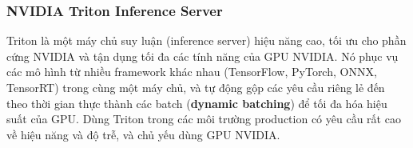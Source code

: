 \subsubsection{NVIDIA Triton Inference Server}
Triton là một máy chủ suy luận (inference server) hiệu năng cao, tối ưu cho phần cứng NVIDIA và tận dụng tối đa các tính năng của GPU NVIDIA. Nó phục vụ các mô hình từ nhiều framework khác nhau (TensorFlow, PyTorch, ONNX, TensorRT) trong cùng một máy chủ, và tự động gộp các yêu cầu riêng lẻ đến theo thời gian thực thành các batch (\textbf{dynamic batching}) để tối đa hóa hiệu suất của GPU. Dùng Triton trong các môi trường production có yêu cầu rất cao về hiệu năng và độ trễ, và chủ yếu dùng GPU NVIDIA.